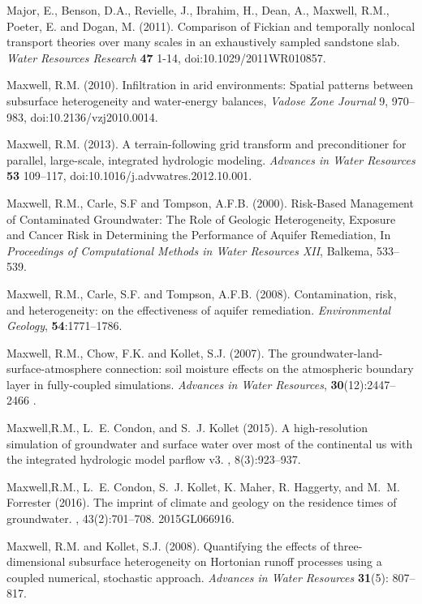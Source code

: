 \begin{thebibliography}{999}
Major, E., Benson, D.A., Revielle, J., Ibrahim, H., Dean, A., Maxwell, R.M., Poeter, E. and Dogan, M. (2011). Comparison of Fickian and temporally nonlocal transport theories over many scales in an exhaustively sampled sandstone slab. {\em Water Resources Research} {\bf 47} 1-14, doi:10.1029/2011WR010857.

Maxwell, R.M. (2010). Infiltration in arid environments: Spatial patterns between subsurface heterogeneity and water-energy balances, {\em Vadose Zone Journal} 9, 970--983, doi:10.2136/vzj2010.0014.

Maxwell, R.M. (2013). A terrain-following grid transform and preconditioner for parallel, large-scale, integrated hydrologic modeling. {\em Advances in Water Resources} {\bf 53} 109--117, doi:10.1016/j.advwatres.2012.10.001. 

Maxwell, R.M., Carle, S.F and Tompson, A.F.B. (2000). Risk-Based Management of Contaminated Groundwater: The Role of Geologic Heterogeneity, Exposure and Cancer Risk in Determining the Performance of Aquifer Remediation, In {\em Proceedings of Computational Methods in Water Resources XII}, Balkema, 533--539.

Maxwell, R.M., Carle, S.F. and Tompson, A.F.B. (2008).
Contamination, risk, and heterogeneity: on the effectiveness of aquifer remediation. {\em Environmental Geology}, {\bf 54}:1771--1786.

Maxwell, R.M., Chow, F.K. and Kollet, S.J. (2007). The groundwater-land-surface-atmosphere connection: soil moisture effects on the atmospheric boundary layer in fully-coupled simulations. {\em Advances in Water Resources}, {\bf 30}(12):2447--2466 .

	Maxwell,R.M., L.~E. Condon, and S.~J. Kollet (2015).
\newblock A high-resolution simulation of groundwater and surface water over
  most of the continental us with the integrated hydrologic model parflow v3.
, 8(3):923--937.

Maxwell,R.M., L.~E. Condon, S.~J. Kollet, K. Maher, R. Haggerty, and
M.~M. Forrester (2016).
\newblock The imprint of climate and geology on the residence times of
  groundwater.
, 43(2):701--708.
\newblock 2015GL066916.

Maxwell, R.M. and Kollet, S.J. (2008). Quantifying the effects of three-dimensional subsurface heterogeneity on Hortonian runoff processes using a coupled numerical, stochastic approach. {\em Advances in Water Resources} {\bf 31}(5): 807--817. 


\end{thebibliography}
